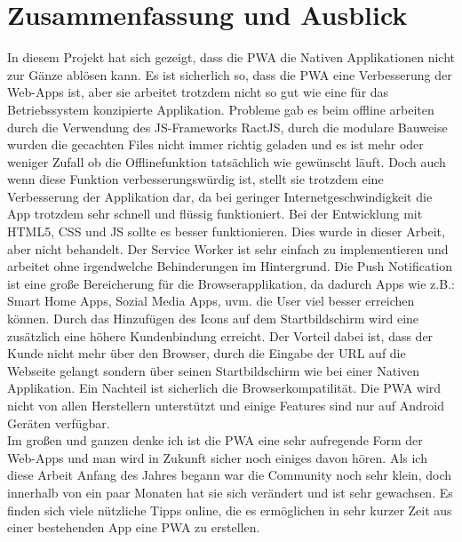 \chapter{Zusammenfassung und Ausblick}
\thispagestyle{standard}
\pagestyle{standard}
\renewcommand{\footrulewidth}{0.4pt}

In diesem Projekt hat sich gezeigt, dass die \acs{PWA} die Nativen Applikationen nicht zur Gänze ablösen kann. Es ist sicherlich so, dass die \acs{PWA} eine Verbesserung der \acs{Web-App}s ist, aber sie  arbeitet trotzdem nicht so gut wie eine für das Betriebssystem konzipierte Applikation.
Probleme gab es beim offline arbeiten durch die Verwendung des \acs{JS}-Frameworks RactJS, durch die modulare Bauweise wurden die gecachten Files nicht immer richtig geladen und es ist mehr oder weniger Zufall ob die Offlinefunktion tatsächlich wie gewünscht läuft. Doch auch wenn diese Funktion verbesserungswürdig ist, stellt sie trotzdem eine Verbesserung der Applikation dar, da bei geringer Internetgeschwindigkeit die App trotzdem sehr schnell und flüssig funktioniert. Bei der Entwicklung mit \acs{HTML}5, \acs{CSS} und \acs{JS} sollte es besser funktionieren. Dies wurde in dieser Arbeit, aber nicht behandelt. 
Der Service Worker ist sehr einfach zu implementieren und arbeitet ohne irgendwelche Behinderungen im Hintergrund.
Die Push Notification ist eine große Bereicherung für die Browserapplikation, da dadurch Apps wie z.B.: Smart Home Apps, Sozial Media Apps, uvm. die User viel besser erreichen können. Durch das Hinzufügen des Icons auf dem Startbildschirm wird eine zusätzlich eine höhere Kundenbindung erreicht. Der Vorteil dabei ist, dass der Kunde nicht mehr über den Browser, durch die Eingabe der URL auf die Webseite gelangt sondern über seinen Startbildschirm wie bei einer Nativen Applikation. Ein Nachteil ist sicherlich die Browserkompatilität. Die \acs{PWA} wird nicht von allen Herstellern unterstützt und einige Features sind nur auf Android Geräten verfügbar. 
\\Im großen und ganzen denke ich ist die \acs{PWA} eine sehr aufregende Form der \acs{Web-App}s und man wird in Zukunft sicher noch einiges davon hören.
Als ich diese Arbeit Anfang des Jahres begann war die Community noch sehr klein, doch innerhalb von ein paar Monaten hat sie sich verändert und ist sehr gewachsen. Es finden sich viele nützliche Tipps online, die es ermöglichen in sehr kurzer Zeit aus einer bestehenden App eine \acs{PWA} zu erstellen. 